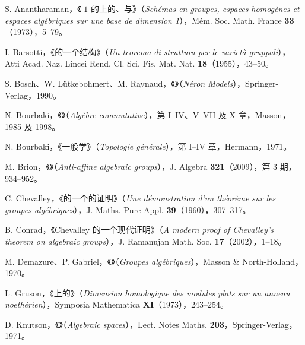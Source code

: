 \noindent [An73] S. Anantharaman，《 $1$ 的上的、与》（\textit{Schémas en groupes, espaces homogènes et espaces algébriques sur une base de dimension 1}），Mém. Soc. Math. France \textbf{33}（1973），5--79。
\par\noindent [Ba55] I. Barsotti，《的一个结构》（\textit{Un teorema di struttura per le varietà gruppali}），Atti Acad. Naz. Lincei Rend. Cl. Sci. Fis. Mat. Nat. \textbf{18}（1955），43--50。
\par\noindent [BLR] S. Bosch、W. Lütkebohmert、M. Raynaud，《》（\textit{Néron Models}），Springer-Verlag，1990。
\par\noindent [BAC] N. Bourbaki，《》（\textit{Algèbre commutative}），第 I--IV、V--VII 及 X 章，Masson，1985 及 1998。
\par\noindent [BTop] N. Bourbaki，《一般学》（\textit{Topologie générale}），第 I--IV 章，Hermann，1971。
\par\noindent [Br09] M. Brion，《》（\textit{Anti-affine algebraic groups}），J. Algebra \textbf{321}（2009），第 3 期，934--952。
\par\noindent [Ch60] C. Chevalley，《的一个的证明》（\textit{Une démonstration d’un théorème sur les groupes algébriques}），J. Maths. Pure Appl. \textbf{39}（1960），307--317。
\par\noindent [Co02] B. Conrad，《Chevalley 的一个现代证明》（\textit{A modern proof of Chevalley’s theorem on algebraic groups}），J. Ramanujan Math. Soc. \textbf{17}（2002），1--18。
\par\noindent [DG70] M. Demazure、P. Gabriel，《》（\textit{Groupes algébriques}），Masson \& North-Holland，1970。
\par\noindent [Gr73] L. Gruson，《上的》（\textit{Dimension homologique des modules plats sur un anneau noethérien}），Symposia Mathematica \textbf{XI}（1973），243--254。
\par\noindent [Kn71] D. Knutson，《》（\textit{Algebraic spaces}），Lect. Notes Maths. \textbf{203}，Springer-Verlag，1971。
